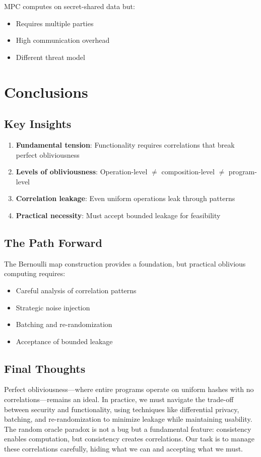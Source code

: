 \documentclass[11pt,final,hidelinks]{article}
\begin{document}
MPC computes on secret-shared data but:
\begin{itemize}
    \item Requires multiple parties
    \item High communication overhead
    \item Different threat model
\end{itemize}

\section{Conclusions}

\subsection{Key Insights}

\begin{enumerate}
    \item \textbf{Fundamental tension}: Functionality requires correlations that break perfect obliviousness
    \item \textbf{Levels of obliviousness}: Operation-level $\neq$ composition-level $\neq$ program-level
    \item \textbf{Correlation leakage}: Even uniform operations leak through patterns
    \item \textbf{Practical necessity}: Must accept bounded leakage for feasibility
\end{enumerate}

\subsection{The Path Forward}

The Bernoulli map construction provides a foundation, but practical oblivious computing requires:
\begin{itemize}
    \item Careful analysis of correlation patterns
    \item Strategic noise injection
    \item Batching and re-randomization
    \item Acceptance of bounded leakage
\end{itemize}

\subsection{Final Thoughts}

Perfect obliviousness—where entire programs operate on uniform hashes with no correlations—remains an ideal. In practice, we must navigate the trade-off between security and functionality, using techniques like differential privacy, batching, and re-randomization to minimize leakage while maintaining usability. The random oracle paradox is not a bug but a fundamental feature: consistency enables computation, but consistency creates correlations. Our task is to manage these correlations carefully, hiding what we can and accepting what we must.


\end{document}
